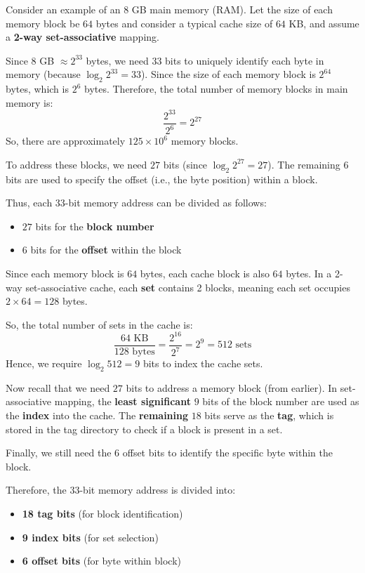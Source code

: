 \documentclass[12pt]{book}
\begin{document}
\begin{example}
Consider an example of an $8$ GB main memory (RAM). Let the size of each memory block be $64$ bytes and consider a typical cache size of $64$ KB, and assume a \textbf{2-way set-associative} mapping.

Since $8$ GB $\approx 2^{33}$ bytes, we need $33$ bits to uniquely identify each byte in memory (because $\log_2 2^{33} = 33$). Since the size of each memory block is $2^{64}$ bytes, which is $2^6$ bytes. Therefore, the total number of memory blocks in main memory is:
\[
    \frac{2^{33}}{2^6} = 2^{27}
\]
So, there are approximately $125 \times 10^6$ memory blocks.

To address these blocks, we need $27$ bits (since $\log_2 2^{27} = 27$). The remaining $6$ bits are used to specify the offset (i.e., the byte position) within a block.

Thus, each $33$-bit memory address can be divided as follows:
\begin{itemize}
    \item $27$ bits for the \textbf{block number}
    \item $6$ bits for the \textbf{offset} within the block
\end{itemize}

Since each memory block is $64$ bytes, each cache block is also $64$ bytes. In a 2-way set-associative cache, each \textbf{set} contains 2 blocks, meaning each set occupies $2 \times 64 = 128$ bytes.

So, the total number of sets in the cache is:
\[
    \frac{64 \text{ KB}}{128 \text{ bytes}} = \frac{2^{16}}{2^7} = 2^9 = 512 \text{ sets}
\]
Hence, we require $\log_2 512 = 9$ bits to index the cache sets.

Now recall that we need $27$ bits to address a memory block (from earlier). In set-associative mapping, the \textbf{least significant} $9$ bits of the block number are used as the \textbf{index} into the cache. The \textbf{remaining} $18$ bits serve as the \textbf{tag}, which is stored in the tag directory to check if a block is present in a set.

Finally, we still need the $6$ offset bits to identify the specific byte within the block.

Therefore, the 33-bit memory address is divided into:
\begin{itemize}
    \item \textbf{18 tag bits} (for block identification)
    \item \textbf{9 index bits} (for set selection)
    \item \textbf{6 offset bits} (for byte within block)
\end{itemize}


\end{example}
\end{document}
